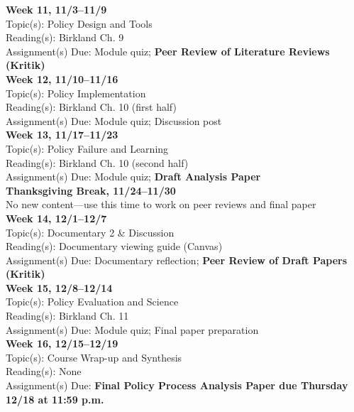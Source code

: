 \documentclass[12pt]{article}     %
\begin{document}
\noindent \textbf{Week 11, 11/3--11/9}\\
Topic(s): Policy Design and Tools\\
Reading(s): Birkland Ch. 9\\
Assignment(s) Due: Module quiz; \textbf{Peer Review of Literature Reviews (Kritik)}\\

\noindent \textbf{Week 12, 11/10--11/16}\\
Topic(s): Policy Implementation\\
Reading(s): Birkland Ch. 10 (first half)\\
Assignment(s) Due: Module quiz; Discussion post\\

\noindent \textbf{Week 13, 11/17--11/23}\\
Topic(s): Policy Failure and Learning\\
Reading(s): Birkland Ch. 10 (second half)\\
Assignment(s) Due: Module quiz; \textbf{Draft Analysis Paper}\\

\noindent \textbf{Thanksgiving Break, 11/24--11/30}\\
No new content---use this time to work on peer reviews and final paper\\

\noindent \textbf{Week 14, 12/1--12/7}\\
Topic(s): Documentary 2 \& Discussion\\
Reading(s): Documentary viewing guide (Canvas)\\
Assignment(s) Due: Documentary reflection; \textbf{Peer Review of Draft Papers (Kritik)}\\

\noindent \textbf{Week 15, 12/8--12/14}\\
Topic(s): Policy Evaluation and Science\\
Reading(s): Birkland Ch. 11\\
Assignment(s) Due: Module quiz; Final paper preparation\\

\noindent \textbf{Week 16, 12/15--12/19}\\
Topic(s): Course Wrap-up and Synthesis\\
Reading(s): None\\
Assignment(s) Due: \textbf{Final Policy Process Analysis Paper due Thursday 12/18 at 11:59 p.m.}
\end{document}
